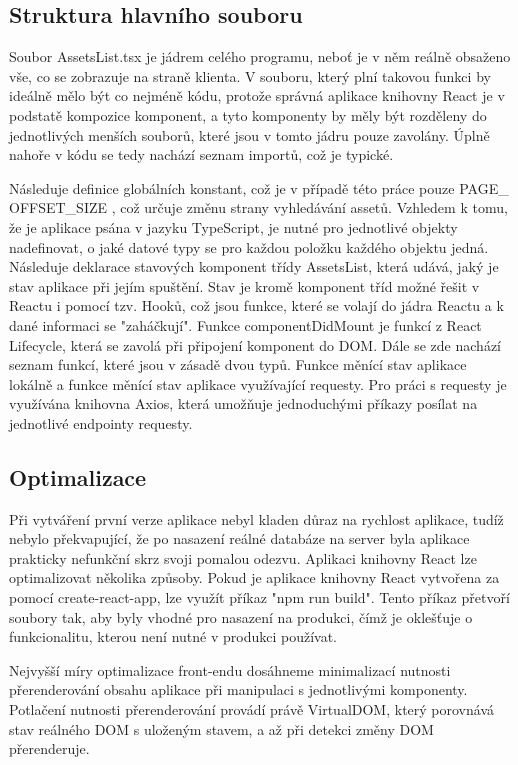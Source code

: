 \subsection{Struktura hlavního souboru}
Soubor AssetsList.tsx je jádrem celého programu, neboť je v něm reálně obsaženo vše, co se zobrazuje na straně klienta. V souboru, který plní takovou funkci by ideálně mělo být co nejméně kódu, protože správná aplikace knihovny React je v podstatě kompozice komponent, a tyto komponenty by měly být rozděleny do jednotlivých menších souborů, které jsou v tomto jádru pouze zavolány. Úplně nahoře v kódu se tedy nachází seznam importů, což je typické. 

Následuje definice globálních konstant, což je v případě této práce pouze 
PAGE\_ OFFSET\_SIZE
, což určuje změnu strany vyhledávání assetů. Vzhledem k tomu, že je aplikace psána v jazyku TypeScript, je nutné pro jednotlivé objekty nadefinovat, o jaké datové typy se pro každou položku každého objektu jedná. Následuje deklarace stavových komponent třídy AssetsList, která udává, jaký je stav aplikace při jejím spuštění. Stav je kromě komponent tříd možné řešit v Reactu i pomocí tzv. Hooků, což jsou funkce, které se volají do jádra Reactu a k dané informaci se "zaháčkují". Funkce componentDidMount je funkcí z React Lifecycle, která se zavolá při připojení komponent do DOM.  Dále se zde nachází seznam funkcí, které jsou v zásadě dvou typů. Funkce měnící stav aplikace lokálně a funkce měnící stav aplikace využívající requesty. Pro práci s requesty je využívána knihovna Axios, která umožňuje jednoduchými příkazy posílat na jednotlivé endpointy requesty.

\subsection{Optimalizace}
Při vytváření první verze aplikace nebyl kladen důraz na rychlost aplikace, tudíž nebylo překvapující, že po nasazení reálné databáze na server byla aplikace prakticky nefunkční skrz svoji pomalou odezvu. Aplikaci knihovny React lze optimalizovat několika způsoby. Pokud je aplikace knihovny React vytvořena za pomocí create-react-app, lze využít příkaz "npm run build". Tento příkaz přetvoří soubory tak, aby byly vhodné pro nasazení na produkci, čímž je oklešťuje o funkcionalitu, kterou není nutné v produkci používat. 

Nejvyšší míry optimalizace front-endu dosáhneme minimalizací nutnosti přerenderování obsahu aplikace při manipulaci s jednotlivými komponenty. Potlačení nutnosti přerenderování provádí právě VirtualDOM, který porovnává stav reálného DOM s uloženým stavem, a až při detekci změny DOM přerenderuje. 

